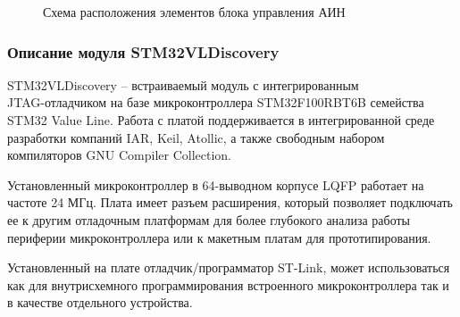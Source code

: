         \begin{figure}[h!]
            \caption{Схема расположения элементов блока управления АИН}
            \label{fig:control-board-place}
        \end{figure}
        
    \subsubsection{Описание модуля STM32VLDiscovery}
        STM32VLDiscovery -- встраиваемый модуль с интегрированным\\
        JTAG-отладчиком на базе микроконтроллера STM32F100RBT6B семейства STM32
        Value Line. Работа с платой поддерживается в интегрированной среде
        разработки компаний IAR, Keil, Atollic, а также свободным набором
        компиляторов GNU Compiler Collection.

        Установленный микроконтроллер в 64-выводном корпусе LQFP работает на
        частоте 24 МГц. Плата имеет разъем расширения, который позволяет
        подключать ее к другим отладочным платформам для более глубокого
        анализа работы периферии микроконтроллера или к макетным платам для
        прототипирования.

        Установленный на плате отладчик/программатор ST-Link, может
        использоваться как для внутрисхемного программирования встроенного
        микроконтроллера так и в качестве отдельного устройства.

